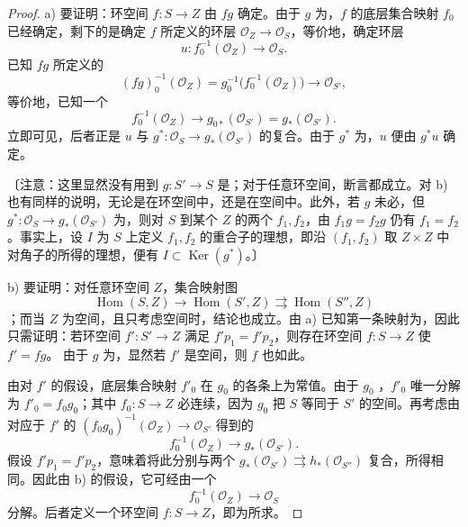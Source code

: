 \begin{proof}
a) 要证明：环空间 $f:S\to Z$ 由 $fg$ 确定。由于 $g$ 为，$f$ 的底层集合映射 $f_0$ 已经确定，剩下的是确定 $f$ 所定义的环层 $\mathcal O_Z\to\mathcal O_S$，等价地，确定环层
\[
u:f_0^{-1}(\mathcal O_Z)\longrightarrow\mathcal O_S.
\]
已知 $fg$ 所定义的
\[
(fg)_0^{-1}(\mathcal O_Z)=g_0^{-1}\bigl(f_0^{-1}(\mathcal O_Z)\bigr)\longrightarrow\mathcal O_{S'},
\]
等价地，已知一个
\[
f_0^{-1}(\mathcal O_Z)\longrightarrow g_{0*}(\mathcal O_{S'})=g_*(\mathcal O_{S'}).
\]
立即可见，后者正是 $u$ 与 $g^*:\mathcal O_S\to g_*(\mathcal O_{S'})$ 的复合。由于 $g^*$ 为，$u$ 便由 $g^*u$ 确定。

〔注意：这里显然没有用到 $g:S'\to S$ 是；对于任意环空间，断言都成立。对 b) 也有同样的说明，无论是在环空间中，还是在空间中。此外，若 $g$ 未必，但 $g^*:\mathcal O_S\to g_*(\mathcal O_{S'})$ 为，则对 $S$ 到某个 $Z$ 的两个 $f_1,f_2$，由 $f_1g=f_2g$ 仍有 $f_1=f_2$。事实上，设 $I$ 为 $S$ 上定义 $f_1,f_2$ 的重合子的理想，即沿 $(f_1,f_2)$ 取 $Z\times Z$ 中对角子的所得的理想，便有 $I\subset\operatorname{Ker}(g^*)$。〕

b) 要证明：对任意环空间 $Z$，集合映射图
\[
\operatorname{Hom}(S,Z)\longrightarrow\operatorname{Hom}(S',Z)\rightrightarrows\operatorname{Hom}(S'',Z)
\]
；而当 $Z$ 为空间，且只考虑空间时，结论也成立。由 a) 已知第一条映射为，因此只需证明：若环空间 $f':S'\to Z$ 满足 $f'p_1=f'p_2$，则存在环空间 $f:S\to Z$ 使 $f'=fg$。
由于 $g$ 为，显然若 $f'$ 是空间，则 $f$ 也如此。

由对 $f'$ 的假设，底层集合映射 $f'_0$ 在 $g_0$ 的各条上为常值。由于 $g_0$ ，$f'_0$ 唯一分解为 $f'_0=f_0g_0$；其中 $f_0:S\to Z$ 必连续，因为 $g_0$ 把 $S$ 等同于 $S'$ 的空间。再考虑由对应于 $f'$ 的 $(f_0g_0)^{-1}(\mathcal O_Z)\to\mathcal O_{S'}$ 得到的
\[
f_0^{-1}(\mathcal O_Z)\longrightarrow g_*(\mathcal O_{S'}).
\]
假设 $f'p_1=f'p_2$，意味着将此分别与两个 $g_*(\mathcal O_{S'})\rightrightarrows h_*(\mathcal O_{S''})$ 复合，所得相同。因此由 b) 的假设，它可经由一个
\[
f_0^{-1}(\mathcal O_Z)\longrightarrow\mathcal O_S
\]
分解。后者定义一个环空间 $f:S\to Z$，即为所求。
\end{proof}

